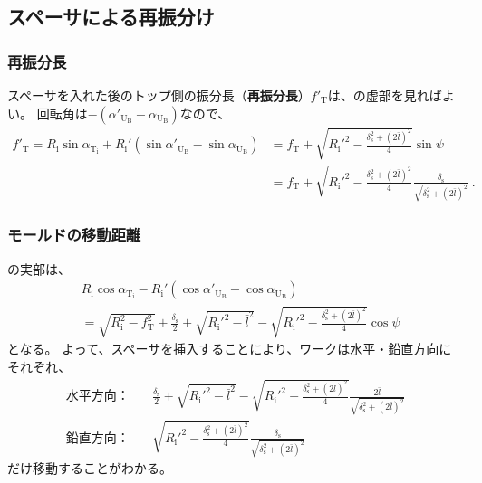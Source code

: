 \subsection{スペーサによる再振分け}

\subsubsection{再振分長}
スペーサを入れた後のトップ側の振分長（\textbf{再振分長}）$f'_\mathrm T$は、の虚部を見ればよい。
回転角は$-(\alpha'_{\mathrm U_\mathrm B}-\alpha_{\mathrm U_\mathrm B})$なので、
\begin{align*}
  f'_\mathrm T
  = R_\mathrm i\sin\alpha_{\mathrm T_\mathrm i}
    +R_\mathrm i'\left(\sin\alpha'_{\mathrm U_\mathrm B}-\sin\alpha_{\mathrm U_\mathrm B}\right)
  &= f_\mathrm T+\sqrt{R_\mathrm i'^2-\frac{\delta_\mathrm s^2+(2\bar l)^2}4}\sin\psi\\
  &= f_\mathrm T+\sqrt{R_\mathrm i'^2-\frac{\delta_\mathrm s^2+(2\bar l)^2}4}\frac{\delta_\mathrm s}{\sqrt{\delta_\mathrm s^2+(2\bar l)^2}}\ .
\end{align*}

\subsubsection{モールドの移動距離}
の実部は、
\begin{align*}
  & R_\mathrm i\cos\alpha_{\mathrm T_\mathrm i}
    -R_\mathrm i'(\cos\alpha'_{\mathrm U_\mathrm B}-\cos\alpha_{\mathrm U_\mathrm B})\\
  & = \sqrt{R_\mathrm i^2-f_\mathrm T^2}+\frac{\delta_\mathrm s}2+\sqrt{R_\mathrm i'^2-\bar l^2}
      -\sqrt{R_\mathrm i'^2-\frac{\delta_\mathrm s^2+(2\bar l)^2}4}\cos\psi
\end{align*}
となる。
よって、スペーサを挿入することにより、ワークは水平・鉛直方向にそれぞれ、
\begin{subequations}
\begin{alignat}{2}
  \label{eq:spacerMoveHdistance}
  \text{水平方向：}\quad
  & \frac{\delta_\mathrm s}2+\sqrt{R_\mathrm i'^2-\bar l^2}-\sqrt{R_\mathrm i'^2-\frac{\delta_\mathrm s^2+(2\bar l)^2}4}\frac{2\bar l}{\sqrt{\delta_\mathrm s^2+(2\bar l)^2}}\\
  \text{鉛直方向：}\quad
  & \sqrt{R_\mathrm i'^2-\frac{\delta_\mathrm s^2+(2\bar l)^2}4}\frac{\delta_\mathrm s}{\sqrt{\delta_\mathrm s^2+(2\bar l)^2}}
\end{alignat}
\end{subequations}
だけ移動することがわかる。



